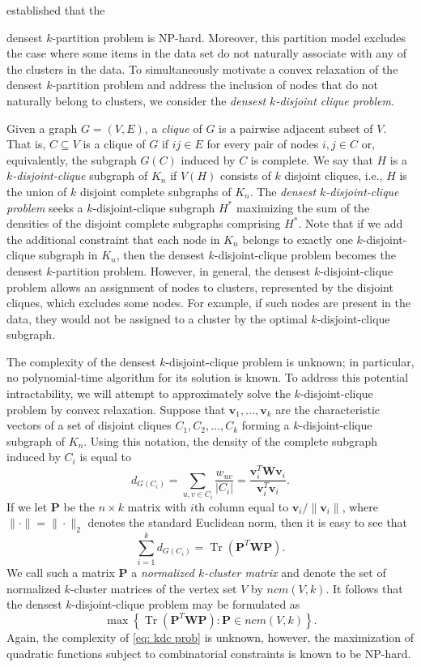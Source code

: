 \documentclass[twoside,11pt]{article}
\DeclareMathOperator{\tr}{{Tr}}
\renewcommand{\P}{\bs{P}}
\newcommand{\bs}{\boldsymbol}
\renewcommand{\v}{\bs{v}}
\newcommand{\W}{\bs {W}}
\newcommand{\0}{\bs{0}}
\newcommand{\bra}[1]{\ensuremath{\left\{ #1 \right\}}} %
\newcommand{\kdc}{\(k\)-disjoint-clique }
\begin{document}
\citet{peng2007approximating} established that the {densest \(k\)-partition problem is NP-hard. Moreover, this partition model excludes the
	case where some items in the data set do not naturally associate
	with any of the clusters in the data.
	To simultaneously motivate a convex relaxation of the densest \(k\)-partition
	problem and address the inclusion of nodes that do not naturally belong to clusters, we consider the \emph{densest
		\(k\)-disjoint clique problem}.

	Given a graph \(G=(V,E)\), a \emph{clique} of \(G\) is a pairwise
	adjacent subset of \(V\). That is, \(C \subseteq V\)
	is a clique of \(G\) if \(ij\in E\) for every pair of nodes \(i,j \in C\)
	or, equivalently, the subgraph \(G(C)\) induced by \(C\) is
	{complete}.
	We say that \(H\) is a \emph{\(k\)-disjoint-clique} subgraph of \(K_n\)
	if \(V(H)\) consists of \(k\) disjoint cliques, i.e., \(H\) is the union
	of \(k\) disjoint complete subgraphs of \(K_n\).
	The \emph{densest \(k\)-disjoint-clique problem} seeks a \(k\)-disjoint-clique
	subgraph \(H^*\) maximizing the sum of the densities of the disjoint
	complete subgraphs comprising \(H^*\).
	Note that if we add the additional constraint that each node in \(K_n\) belongs
	to exactly one \kdc subgraph in \(K_n\), then
	the densest \kdc problem becomes the densest \(k\)-partition problem.
	However, in general, the densest \kdc problem allows an assignment of nodes
	to clusters, represented by the disjoint cliques, which excludes
	some nodes. For example, if such nodes are present in the data, they would not be assigned to a
	cluster by the optimal \kdc subgraph.

	The complexity of the densest \kdc problem is unknown;
	in particular, no polynomial-time algorithm for its solution is known.
	To address this potential intractability, we will attempt to approximately solve the \kdc problem by convex
	relaxation.
	Suppose that \( \v_1, \dots, \v_k \) are the characteristic vectors
	of a set of disjoint cliques \(C_1, C_2, \dots, C_k\)
	forming a \kdc subgraph of \(K_n\).
	Using this notation, the density of the complete subgraph induced
	by \(C_i\) is equal to
	\[
	d_{G(C_i)} = \sum_{u, v \in C_{i}} \frac{w_{uv}}{|C_i|}
	= \frac{\v_i^T \W \v_i}{\v_i^T \v_i}.
	\]
	If we let \(\P\) be the \(n \times k\) matrix with \(i\)th column equal to \(\v_i/ \|\v_i\|\), where \(\|\cdot\| = \|\cdot\|_2\)
	denotes the standard Euclidean norm, then
	it is easy to see that
	\[
	\sum_{i=1}^k d_{G(C_i)} = \tr(\P^T \W \P).
	\]
	We call such a matrix \(\P\) a \emph{normalized \(k\)-cluster matrix} and denote the set of normalized \(k\)-cluster
	matrices of the vertex set \(V\) by \(ncm(V,k)\).
	It follows that the densest \kdc problem may be formulated as
	\begin{equation} \label{eq: kdc prob}
	\max \bra{ \tr(\P^T \W \P) : \P \in ncm(V,k) }.
	\end{equation}
	Again, the complexity of \eqref{eq: kdc prob} is unknown, however, the maximization of quadratic functions
	subject to combinatorial constraints is known to be NP-hard.

}
\end{document}
